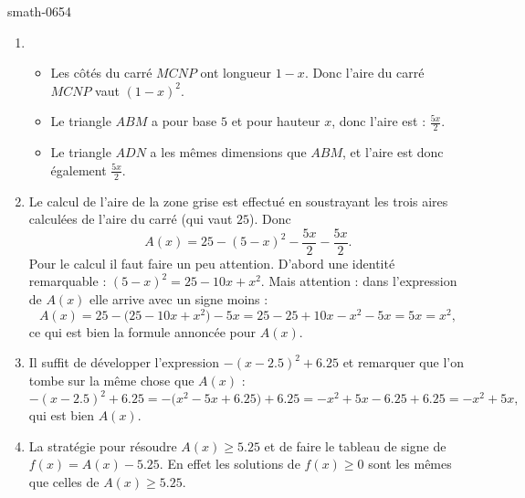 
\begin{corrige}{smath-0654}

    \begin{enumerate}
        \item
            \begin{itemize}
                \item 
            Les côtés du carré \( MCNP\) ont longueur \( 1-x\). Donc l'aire du carré \( MCNP\) vaut \( (1-x)^2\).
        \item
            Le triangle \( ABM\) a pour base \( 5\) et pour hauteur \( x\), donc l'aire est : \( \frac{ 5x }{ 2 }\).
        \item
            Le triangle \( ADN\) a les mêmes dimensions que \( ABM\), et l'aire est donc également \( \frac{ 5x }{ 2 }\).
            \end{itemize}
        \item
            Le calcul de l'aire de la zone grise est effectué en soustrayant les trois aires calculées de l'aire du carré (qui vaut \( 25\)). Donc
            \begin{equation}
                A(x)=25-(5-x)^2-\frac{ 5x }{ 2 }-\frac{ 5x }{2}.
            \end{equation}
            Pour le calcul il faut faire un peu attention. D'abord une identité remarquable : \( (5-x)^2=25-10x+x^2\). Mais attention : dans l'expression de \( A(x)\) elle arrive avec un signe moins : 
            \begin{equation}
                A(x)=25-\big(  25-10x+x^2   \big)-5x=25-25+10x-x^2-5x=5x=x^2,
            \end{equation}
            ce qui est bien la formule annoncée pour \( A(x)\).
        \item
            Il suffit de développer l'expression \(  -(x-2.5)^2+6.25  \) et remarquer que l'on tombe sur la même chose que \( A(x)\) :
            \begin{equation}
                -(x-2.5)^2+6.25=-\big( x^2-5x+6.25 \big)+6.25=-x^2+5x-6.25+6.25=-x^2+5x,
            \end{equation}
            qui est bien \( A(x)\).
        \item
            La stratégie pour résoudre \( A(x)\geq 5.25\) et de faire le tableau de signe de \( f(x)=A(x)-5.25\). En effet les solutions de \( f(x)\geq 0\) sont les mêmes que celles de \( A(x)\geq 5.25\).

\end{enumerate}
\end{corrige}
